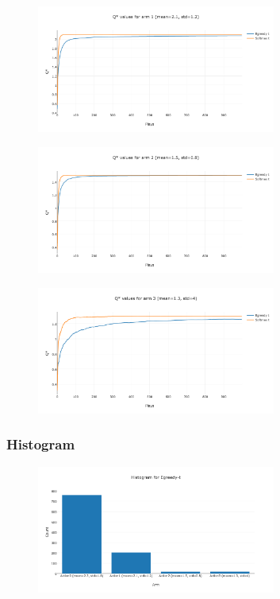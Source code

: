\documentclass[11pt]{article}
\begin{document}
\begin{figure}[H]
   \centering
   \includegraphics[width=0.7\textwidth]{img/1-3/q2.png}
\end{figure}

\begin{figure}[H]
   \centering
   \includegraphics[width=0.7\textwidth]{img/1-3/q3.png}
\end{figure}


\begin{figure}[H]
   \centering
   \includegraphics[width=0.7\textwidth]{img/1-3/q4.png}
\end{figure}

\subsubsection{Histogram}

\begin{figure}[H]
   \centering
   \includegraphics[width=0.7\textwidth]{img/1-3/h1.png}
\end{figure}
\end{document}
